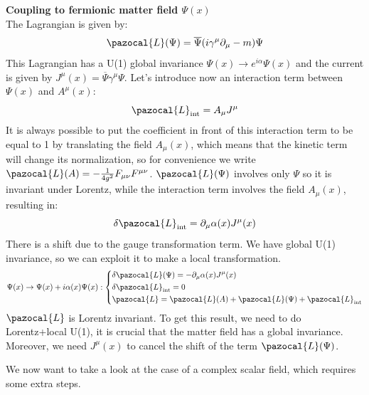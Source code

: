 \documentclass[../main.tex]{subfiles}
\begin{document}
\begin{example}
\textbf{Coupling to fermionic matter field $\Psi(x)$}\\
The Lagrangian is given by:
\[
\pazocal{L}(\Psi)=\overline{\Psi}(i\gamma^\mu\partial_\mu-m)\Psi
\]
This Lagrangian has a U(1) global invariance $\Psi(x)\to e^{i\alpha}\Psi(x)$ and the current is given by $J^\mu(x)=\overline{\Psi}\gamma^\mu\Psi$. Let's introduce now an interaction term between $\Psi(x)$ and $A^\mu(x)$:
\[
\pazocal{L}_{\text{int}}=A_\mu J^\mu
\]
It is always possible to put the coefficient in front of this interaction term to be equal to 1 by translating the field $A_\mu(x)$, which means that the kinetic term will change its normalization, so for convenience we write $\pazocal{L}(A)=-\frac{1}{4g^2}F_{\mu\nu}F^{\mu\nu}$. $\pazocal{L}(\Psi)$ involves only $\Psi$ so it is invariant under Lorentz, while the interaction term involves the field $A_\mu(x)$, resulting in:
\[
\delta\pazocal{L}_{\text{int}}=\partial_\mu\alpha(x)J^\mu(x)
\]
There is a shift due to the gauge transformation term. We have global U(1) invariance, so we can exploit it to make a local transformation.
\[
\Psi(x)\to\Psi(x)+i\alpha(x)\Psi(x):\left\{
\begin{aligned}
&\delta\pazocal{L}(\Psi)=-\partial_\mu\alpha(x)J^\mu(x)\\
&\delta\pazocal{L}_{\text{int}}=0\\
&\pazocal{L}=\pazocal{L}(A)+\pazocal{L}(\Psi)+\pazocal{L}_{\text{int}} 
\end{aligned}
\right.
\]
$\pazocal{L}$ is Lorentz invariant. To get this result, we need to do Lorentz+local U(1), it is crucial that the matter field has a global invariance. Moreover, we need $J^\mu(x)$ to cancel the shift of the term $\pazocal{L}(\Psi)$.
\end{example}
We now want to take a look at the case of a complex scalar field, which requires some extra steps.
\end{document}
